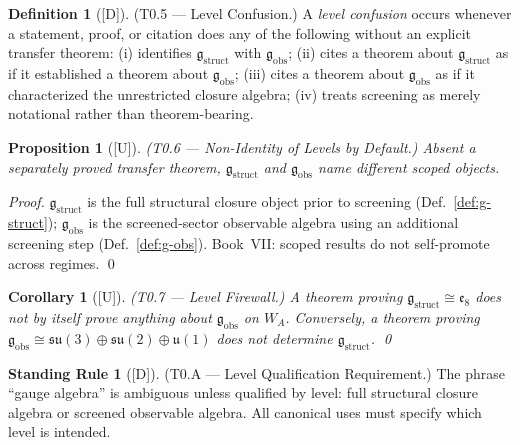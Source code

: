 \documentclass[12pt,oneside]{amsbook}
\theoremstyle{plain}
\newtheorem{proposition}[theorem]{Proposition}
\newtheorem{corollary}[theorem]{Corollary}
\theoremstyle{definition}
\newtheorem{definition}[theorem]{Definition}
\newtheorem{standingrule}[theorem]{Standing Rule}
\theoremstyle{remark}
\newcommand{\status}[1]{\textup{[#1]}}
\begin{document}
\begin{definition}[\status{D}]\label{def:level-confusion}
\textup{(T0.5 --- Level Confusion.)}
A \emph{level confusion} occurs whenever a statement, proof, or
citation does any of the following without an explicit transfer
theorem: \textup{(i)} identifies
$\mathfrak{g}_{\mathrm{struct}}$ with $\mathfrak{g}_{\mathrm{obs}}$;
\textup{(ii)} cites a theorem about $\mathfrak{g}_{\mathrm{struct}}$ as
if it established a theorem about $\mathfrak{g}_{\mathrm{obs}}$;
\textup{(iii)} cites a theorem about $\mathfrak{g}_{\mathrm{obs}}$ as if
it characterized the unrestricted closure algebra; \textup{(iv)} treats
screening as merely notational rather than theorem-bearing.
\end{definition}

\begin{proposition}[\status{U}]\label{prop:T0-non-identity}
\textup{(T0.6 --- Non-Identity of Levels by Default.)}
Absent a separately proved transfer theorem,
$\mathfrak{g}_{\mathrm{struct}}$ and $\mathfrak{g}_{\mathrm{obs}}$
name different scoped objects.
\end{proposition}

\begin{proof}
$\mathfrak{g}_{\mathrm{struct}}$ is the full structural closure object
prior to screening (Def.~\ref{def:g-struct});
$\mathfrak{g}_{\mathrm{obs}}$ is the screened-sector observable
algebra using an additional screening step
(Def.~\ref{def:g-obs}). Book~VII: scoped results do not self-promote
across regimes. \qed
\end{proof}

\begin{corollary}[\status{U}]\label{cor:T0-firewall}
\textup{(T0.7 --- Level Firewall.)}
A theorem proving $\mathfrak{g}_{\mathrm{struct}} \cong \mathfrak{e}_8$
does not by itself prove anything about $\mathfrak{g}_{\mathrm{obs}}$
on $W_A$. Conversely, a theorem proving
$\mathfrak{g}_{\mathrm{obs}} \cong
\mathfrak{su}(3)\oplus\mathfrak{su}(2)\oplus\mathfrak{u}(1)$
does not determine $\mathfrak{g}_{\mathrm{struct}}$. \qed
\end{corollary}

\begin{standingrule}[\status{D}]\label{sr:T0A}
\textup{(T0.A --- Level Qualification Requirement.)}
The phrase ``gauge algebra'' is ambiguous unless qualified by level:
full structural closure algebra or screened observable algebra.
All canonical uses must specify which level is intended.
\end{standingrule}
\end{document}
